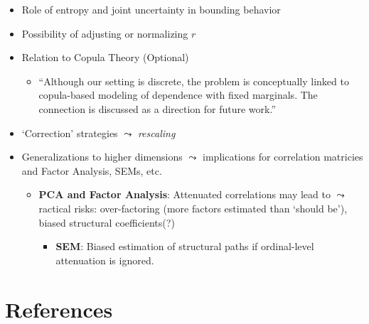 \documentclass[
  12pt,
]{article}
\providecommand{\tightlist}{%
  \setlength{\itemsep}{0pt}\setlength{\parskip}{0pt}}\usepackage{longtable,booktabs,array}
\theoremstyle{plain}
\theoremstyle{definition}
\theoremstyle{remark}
\begin{document}
\begin{itemize}
\tightlist
\item
  Role of entropy and joint uncertainty in bounding behavior\\
\item
  Possibility of adjusting or normalizing \(r\)
\item
  Relation to Copula Theory (Optional)

  \begin{itemize}
  \tightlist
  \item
    ``Although our setting is discrete, the problem is conceptually
    linked to copula-based modeling of dependence with fixed marginals.
    The connection is discussed as a direction for future work.''
  \end{itemize}
\item
  `Correction' strategies \(\leadsto\) \emph{rescaling}
\item
  Generalizations to higher dimensions \(\leadsto\) implications for
  correlation matricies and Factor Analysis, SEMs, etc.

  \begin{itemize}
  \tightlist
  \item
    \textbf{PCA and Factor Analysis}: Attenuated correlations may lead
    to \(\leadsto\) ractical risks: over-factoring (more factors
    estimated than `should be'), biased structural coefficients(?)

    \begin{itemize}
    \tightlist
    \item
      \textbf{SEM}: Biased estimation of structural paths if
      ordinal-level attenuation is ignored.
    \end{itemize}
  \end{itemize}
\end{itemize}

\newpage

\section{References}\label{references}
\end{document}

